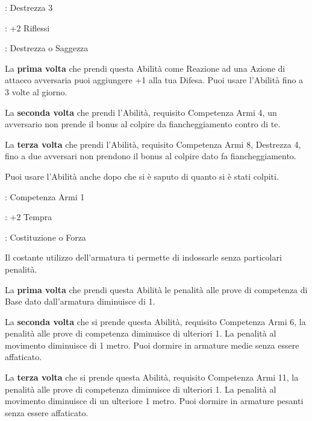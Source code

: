 \begin{multicols}{2}
\begin{description}[noitemsep, topsep=0pt, parsep=0pt, partopsep=0pt, leftmargin=0cm, labelwidth=2.5cm]
    \item[\textbf{Requisito}]: Destrezza 3
    \item[\textbf{Tiri Salvezza}]: +2 Riflessi
    \item[\textbf{Caratteristica}]: Destrezza o Saggezza
\end{description}

La \textbf{prima volta} che prendi questa Abilità come Reazione ad una Azione di attacco avversaria puoi aggiungere +1 alla tua Difesa. Puoi usare l'Abilità fino a 3 volte al giorno.

La \textbf{seconda volta} che prendi l'Abilità, requisito Competenza Armi 4, un avversario non prende il bonus al colpire da fiancheggiamento contro di te.

La \textbf{terza volta} che prendi l'Abilità, requisito Competenza Armi 8, Destrezza 4, fino a due avversari non prendono il bonus al colpire dato fa fiancheggiamento.

Puoi usare l'Abilità anche dopo che si è saputo di quanto si è stati colpiti.

\begin{description}[noitemsep, topsep=0pt, parsep=0pt, partopsep=0pt, leftmargin=0cm, labelwidth=2.5cm]
    \item[\textbf{Requisito}]: Competenza Armi 1
    \item[\textbf{Tiri Salvezza}]: +2 Tempra
    \item[\textbf{Caratteristica}]: Costituzione o Forza
\end{description}

Il costante utilizzo dell'armatura ti permette di indossarle senza particolari penalità.

La \textbf{prima volta} che prendi questa Abilità le penalità alle prove di competenza di Base dato dall'armatura diminuisce di 1.

La \textbf{seconda volta} che si prende questa Abilità, requisito Competenza Armi 6, la penalità alle prove di competenza diminuisce di ulteriori 1. La penalità al movimento diminuisce di 1 metro. Puoi dormire in armature medie senza essere affaticato.

La \textbf{terza volta} che si prende questa Abilità, requisito Competenza Armi 11, la penalità alle prove di competenza diminuisce di ulteriori 1. La penalità al movimento diminuisce di un ulteriore 1 metro. Puoi dormire in armature pesanti senza essere affaticato.


\end{multicols}
